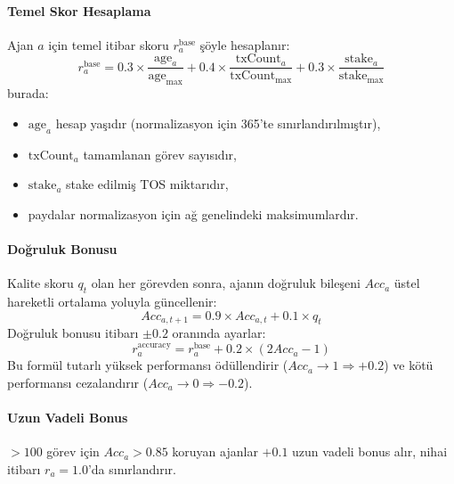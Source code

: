 \documentclass[11pt]{article}
\begin{document}
\paragraph{Temel Skor Hesaplama} Ajan $a$ için temel itibar skoru $r_a^{\text{base}}$ şöyle hesaplanır:
\begin{equation}
r_a^{\text{base}} = 0.3 \times \frac{\text{age}_a}{\text{age}_{\max}} + 0.4 \times \frac{\text{txCount}_a}{\text{txCount}_{\max}} + 0.3 \times \frac{\text{stake}_a}{\text{stake}_{\max}}
\end{equation}
burada:
\begin{itemize}[noitemsep]
  \item $\text{age}_a$ hesap yaşıdır (normalizasyon için 365'te sınırlandırılmıştır),
  \item $\text{txCount}_a$ tamamlanan görev sayısıdır,
  \item $\text{stake}_a$ stake edilmiş TOS miktarıdır,
  \item paydalar normalizasyon için ağ genelindeki maksimumlardır.
\end{itemize}

\paragraph{Doğruluk Bonusu} Kalite skoru $q_t$ olan her görevden sonra, ajanın doğruluk bileşeni $Acc_a$ üstel hareketli ortalama yoluyla güncellenir:
\begin{equation}
Acc_{a,t+1} = 0.9 \times Acc_{a,t} + 0.1 \times q_t
\end{equation}
Doğruluk bonusu itibarı $\pm 0.2$ oranında ayarlar:
\begin{equation}
r_a^{\text{accuracy}} = r_a^{\text{base}} + 0.2 \times (2 Acc_a - 1)
\end{equation}
Bu formül tutarlı yüksek performansı ödüllendirir ($Acc_a \to 1 \Rightarrow +0.2$) ve kötü performansı cezalandırır ($Acc_a \to 0 \Rightarrow -0.2$).

\paragraph{Uzun Vadeli Bonus} $>100$ görev için $Acc_a > 0.85$ koruyan ajanlar $+0.1$ uzun vadeli bonus alır, nihai itibarı $r_a = 1.0$'da sınırlandırır.
\end{document}
